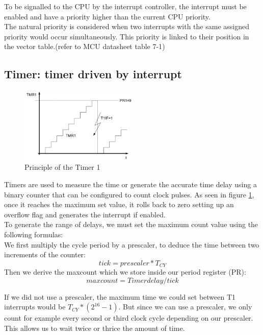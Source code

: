 \noindent
To be signalled to the CPU by the interrupt controller, the interrupt must be enabled and have a priority higher than the current CPU priority.\\
The natural priority is considered when two interrupts with the same assigned priority would occur simultaneously. This priority is linked to their position in the vector table.(refer to MCU datasheet table 7-1\cite{mcu})

\subsection{Timer: timer driven by interrupt}\label{subsec:timer}

\begin{figure}[H]
    \centering
    \includegraphics[width=0.5\textwidth]{figures/software/t1_demo.png}
    \caption{Principle of the Timer 1 \cite{alex}}
    \label{fig:t1_demo}
\end{figure}

Timers are used to measure the time or generate the accurate time delay using a binary counter that can be configured to count clock pulses. As seen in figure \ref{fig:t1_demo}, once it reaches the maximum set value, it rolls back to zero setting up an overflow flag and generates the interrupt if enabled. \\

\noindent
To generate the range of delays, we must set the maximum count value using the following formulas:\\
We first multiply the cycle period by a prescaler, to deduce the time between two increments of the counter:
$$tick=prescaler*T_{CY}$$
Then we derive the maxcount which we store inside our period register (PR):
$$maxcount=Timer delay/tick$$

If we did not use a prescaler, the maximum time we could set between T1 interrupts would be $T_{CY}*(2^{16}-1)$. But since we can use a prescaler, we only count for example every second or third clock cycle depending on our prescaler. This allows us to wait twice or thrice the amount of time.

